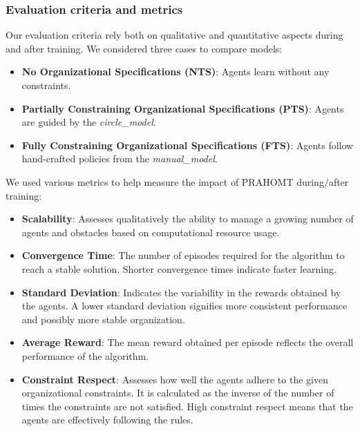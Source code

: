 \documentclass[runningheads]{llncs}
\theoremstyle{freethm}
\theoremstyle{proofoutline}
\begin{document}
\subsubsection{Evaluation criteria and metrics}

Our evaluation criteria rely both on qualitative and quantitative aspects during and after training. We considered three cases to compare models:
\begin{itemize}
    \item \textbf{No Organizational Specifications (NTS)}: Agents learn without any constraints.
    \item \textbf{Partially Constraining Organizational Specifications (PTS)}: Agents are guided by the \textit{circle\_model}.
    \item \textbf{Fully Constraining Organizational Specifications (FTS)}: Agents follow hand-crafted policies from the \textit{manual\_model}.
\end{itemize}

We used various metrics to help measure the impact of PRAHOMT during/after training:
\begin{itemize}
    \item \textbf{Scalability}: Assesses qualitatively the ability to manage a growing number of agents and obstacles based on computational resource usage.
    \item \textbf{Convergence Time}: The number of episodes required for the algorithm to reach a stable solution. Shorter convergence times indicate faster learning.
    \item \textbf{Standard Deviation}: Indicates the variability in the rewards obtained by the agents. A lower standard deviation signifies more consistent performance and possibly more stable organization.
    \item \textbf{Average Reward}: The mean reward obtained per episode reflects the overall performance of the algorithm.
    \item \textbf{Constraint Respect}: Assesses how well the agents adhere to the given organizational constraints. It is calculated as the inverse of the number of times the constraints are not satisfied. High constraint respect means that the agents are effectively following the rules.
\end{itemize}
\end{document}
